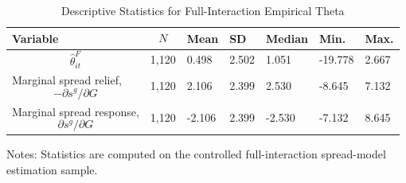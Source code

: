 \begin{table}[H]\centering
\begin{threeparttable}
\caption{Descriptive Statistics for Full-Interaction Empirical Theta}
\label{tab:theta_descriptive_stats}
\scriptsize
\begin{tabularx}{\textwidth}{lYYYYYY}
\toprule
Variable & $$N$$ & Mean & SD & Median & Min. & Max. \\
\midrule
$$\widehat{\theta}^{F}_{it}$$ & 1,120 & 0.498 & 2.502 & 1.051 & -19.778 & 2.667 \\
Marginal spread relief, $$-\partial s^g/\partial G$$ & 1,120 & 2.106 & 2.399 & 2.530 & -8.645 & 7.132 \\
Marginal spread response, $$\partial s^g/\partial G$$ & 1,120 & -2.106 & 2.399 & -2.530 & -7.132 & 8.645 \\
\bottomrule
\end{tabularx}
\begin{tablenotes}[flushleft]\footnotesize
\item Notes: Statistics are computed on the controlled full-interaction spread-model estimation sample.
\end{tablenotes}
\end{threeparttable}
\end{table}

